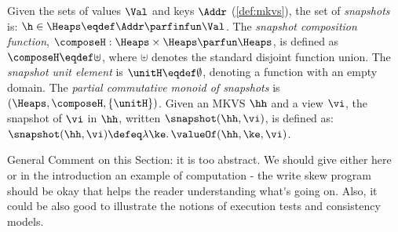 \begin{definition}[Snapshots]
\label{def:heaps}
\label{def:snapshot}
Given the sets of values $\Val$  and keys \( \Addr\)  (\cref{def:mkvs}), the set of \emph{snapshots} is:
$
    \h \in \Heaps \eqdef \Addr \parfinfun \Val
$. 
The \emph{snapshot composition function}, $\composeH: \Heaps \times \Heaps \parfun \Heaps$, is defined as $\composeH \eqdef \uplus$, where $\uplus$ denotes the standard disjoint function union. The \emph{ snapshot unit element} is $\unitH \eqdef \emptyset$, denoting a function with an empty domain.
The \emph{partial commutative monoid of snapshots} is $(\Heaps, \composeH, \{\unitH\})$.
Given an MKVS $\hh$ and a view $\vi$, the snapshot of $\vi$ in $\hh$, written $\snapshot(\hh, \vi) $, is defined as:
$
    \snapshot(\hh, \vi) \defeq \lambda \ke \ldotp \valueOf(\hh, \ke, \vi)
$.
\end{definition}

\ac{General Comment on this Section: it is too abstract. We 
should give either here or in the introduction an example of computation - 
the write skew program should be okay that helps the reader understanding 
what's going on. Also, it could be also good to illustrate the notions 
of execution tests and consistency models.}

